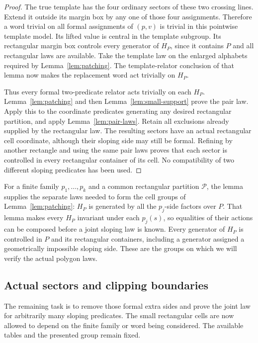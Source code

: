 \begin{proof}
The true template has the four ordinary sectors of these two
crossing lines.  Extend it outside its margin box by any one
of those four assignments.  Therefore a word trivial on all
formal assignments of $(p,v)$ is trivial in this pointwise
template model.  Its lifted value is central in the template
subgroup.  Its rectangular margin box controls every generator
of $H_P$, since it contains $P$ and all rectangular laws are
available.  Take the template law on the enlarged alphabets
required by Lemma~\ref{lem:patching}.  The template-relator
conclusion of that lemma now makes the replacement word act
trivially on $H_P$.

Thus every formal two-predicate relator acts trivially on each
$H_P$.  Lemma~\ref{lem:patching} and then
Lemma~\ref{lem:small-support} prove the pair law.  Apply this
to the coordinate predicates generating any desired rectangular
partition, and apply Lemma~\ref{lem:pair-laws}.  Retain all
exclusions already supplied by the rectangular law.  The
resulting sectors have an actual rectangular cell coordinate,
although their sloping side may still be formal.  Refining by
another rectangle and using the same pair laws proves that
each sector is controlled in every rectangular container of
its cell.  No compatibility of two different sloping predicates
has been used.
\end{proof}

For a finite family $p_1,\ldots,p_k$ and a common rectangular
partition $\mathcal P$, the lemma supplies the separate laws
needed to form the cell groups of Lemma~\ref{lem:patching}:
$H_P$ is generated by all the $p_j$-side factors over $P$.
That lemma makes every $H_P$ invariant under each $p_j(s)$,
so equalities of their actions can be composed before a joint
sloping law is known.  Every generator of $H_P$ is controlled
in $P$ and its rectangular containers, including a generator
assigned a geometrically impossible sloping side.  These are
the groups on which we will verify the actual polygon laws.

\subsection{Actual sectors and clipping boundaries}

The remaining task is to remove those formal extra sides and
prove the joint law for arbitrarily many sloping predicates.
The small rectangular cells are now allowed to depend on the
finite family or word being considered.  The available tables
and the presented group remain fixed.

